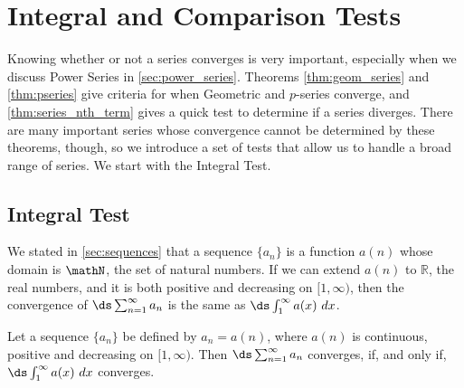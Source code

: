 \section{Integral and Comparison Tests}\label{sec:int_comp_tests}

Knowing whether or not a series converges is very important, especially when we discuss Power Series in \autoref{sec:power_series}. Theorems \ref{thm:geom_series} and \ref{thm:pseries} give criteria for when Geometric and $p$-series converge, and \autoref{thm:series_nth_term} gives a quick test to determine if a series diverges. There are many important series whose convergence cannot be determined by these theorems, though, so we introduce a set of tests that allow us to handle a broad range of series. We start with the Integral Test.\\


\subsection*{Integral Test}

We stated in \autoref{sec:sequences} that a sequence $\{a_n\}$ is a function $a(n)$ whose domain is $\mathN$, the set of natural numbers. If we can extend $a(n)$ to $\mathbb{R}$, the real numbers, and it is both positive and decreasing on $[1,\infty)$, then the convergence of $\ds \sum_{n=1}^\infty a_n$ is the same as $\ds\int_1^\infty a(x)\ dx$. 

{Let a sequence $\{a_n\}$ be defined by $a_n=a(n)$, where $a(n)$ is continuous, positive and decreasing on $[1,\infty)$. Then $\ds \sum_{n=1}^\infty a_n$ converges, if, and only if, $\ds\int_1^\infty a(x)\ dx$ converges.
}

